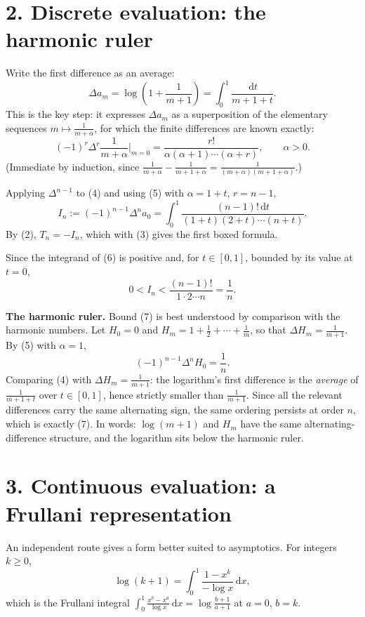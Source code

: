 \documentclass[12pt]{article}
\newcommand{\dd}{\,\mathrm{d}}
\newcommand{\Tn}{T_n}
\newcommand{\In}{I_n}
\newcommand{\D}{\Delta}
\newcommand{\Hh}{H}
\begin{document}
\section*{2. Discrete evaluation: the harmonic ruler}

Write the first difference as an average:
\[
\D a_m=\log\left(1+\frac1{m+1}\right)=\int_0^1\frac{\dd t}{m+1+t}.
\tag{4}
\]
This is the key step: it expresses \(\D a_m\) as a superposition of the
elementary sequences \(m\mapsto\frac1{m+\alpha}\), for which the finite
differences are known exactly:
\[
(-1)^{r}\D^{r}\frac1{m+\alpha}\bigg|_{m=0}
=\frac{r!}{\alpha(\alpha+1)\cdots(\alpha+r)},
\qquad\alpha>0 .
\tag{5}
\]
(Immediate by induction, since
\(\frac1{m+\alpha}-\frac1{m+1+\alpha}=\frac1{(m+\alpha)(m+1+\alpha)}\).)

Applying \(\D^{n-1}\) to (4) and using (5) with \(\alpha=1+t\),
\(r=n-1\),
\[
\In:=(-1)^{n-1}\D^{n}a_0
=\int_0^1\frac{(n-1)!\dd t}{(1+t)(2+t)\cdots(n+t)} .
\tag{6}
\]
By (2), \(\Tn=-\In\), which with (3) gives the first boxed formula.

Since the integrand of (6) is positive and, for \(t\in[0,1]\), bounded by
its value at \(t=0\),
\[
\boxed{\displaystyle
0<\In<\frac{(n-1)!}{1\cdot2\cdots n}=\frac1n .}
\tag{7}
\]

\textbf{The harmonic ruler.} Bound (7) is best understood by comparison
with the harmonic numbers. Let \(\Hh_0=0\) and
\(\Hh_m=1+\frac12+\cdots+\frac1m\), so that
\(\D \Hh_m=\frac1{m+1}\). By (5) with \(\alpha=1\),
\[
(-1)^{n-1}\D^{n}\Hh_0=\frac1n .
\tag{8}
\]
Comparing (4) with \(\D \Hh_m=\frac1{m+1}\): the logarithm's first
difference is the \emph{average} of \(\frac1{m+1+t}\) over
\(t\in[0,1]\), hence strictly smaller than \(\frac1{m+1}\). Since all the
relevant differences carry the same alternating sign, the same ordering
persists at order \(n\), which is exactly (7). In words: \(\log(m+1)\)
and \(\Hh_m\) have the same alternating-difference structure, and the
logarithm sits below the harmonic ruler.

\section*{3. Continuous evaluation: a Frullani representation}

An independent route gives a form better suited to asymptotics. For
integers \(k\ge0\),
\[
\log(k+1)=\int_0^1\frac{1-x^k}{-\log x}\dd x,
\tag{9}
\]
which is the Frullani integral \(\int_0^1\frac{x^{b}-x^{a}}{\log x}\dd x
=\log\frac{b+1}{a+1}\) at \(a=0\), \(b=k\).
\end{document}

